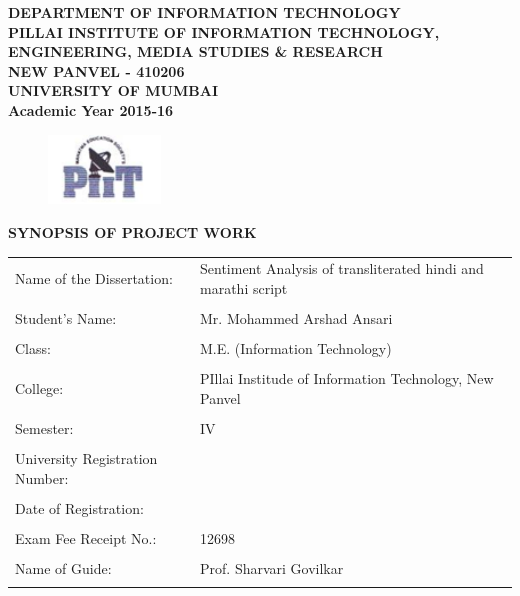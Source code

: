 \documentclass[12pt]{article}
\begin{document}
\newpage
\begin{center}
  	\fontsize{14}{20}\selectfont \textbf{DEPARTMENT OF INFORMATION TECHNOLOGY\\PILLAI INSTITUTE OF INFORMATION TECHNOLOGY,\\
	ENGINEERING, MEDIA STUDIES \& RESEARCH\\ NEW PANVEL - 410206\\UNIVERSITY OF
    MUMBAI\\Academic Year 2015-16}

	\begin{figure}[ht!]
	  \centering
	  \includegraphics[width=30mm]{piit.png}
	\end{figure}

  	\fontsize{12}{30}\selectfont \textbf{SYNOPSIS OF PROJECT WORK}\\
\end{center}
\begin{left}
    \begin{tabular}{ll}
        Name of the Dissertation: & Sentiment Analysis of transliterated hindi and marathi script\\
        \hfill&\hfill\\
        Student's Name: & Mr. Mohammed Arshad Ansari\\
        \hfill&\hfill\\
        Class: & M.E. (Information Technology)\\
        \hfill&\hfill\\
        College: & PIllai Institude of Information Technology, New Panvel\\
        \hfill&\hfill\\
        Semester: & IV\\
        \hfill&\hfill\\
        University Registration Number: & \\
        \hfill&\hfill\\
        Date of Registration: & \\
        \hfill&\hfill\\
        Exam Fee Receipt No.: & 12698\\
        \hfill&\hfill\\
        Name of Guide: & Prof. Sharvari Govilkar\\
        \hfill&\hfill\\
    \end{tabular}
\end{left}
\end{document}
